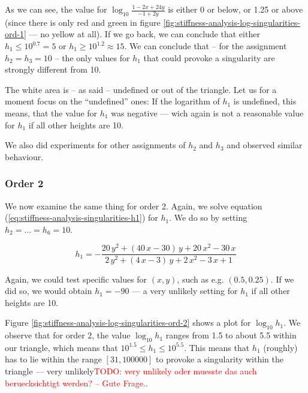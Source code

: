 \documentclass{article}
\newcommand{\todo}[2][]{\textcolor{red}{TODO\ifthenelse{\equal{#1}{}}{}{[#1]}: #2}}
\begin{document}
As we can see, the value for $\log_{10}\frac{1-2x+24y}{-1+2y}$ is either 0 or below, or 1.25 or above (since there is only red and green in figure \ref{fig:stiffness-analysis-log-singularities-ord-1} --- no yellow at all). If we go back, we can conclude that either $h_1 \leq 10^{0.7} = 5$ or $h_1\geq 10^{1.2} \approx 15$. We can conclude that -- for the assignment $h_2=h_3=10$ -- the only values for $h_1$ that could provoke a singularity are strongly different from 10.

The white area is -- as said -- undefined or out of the triangle. Let us for a moment focus on the ``undefined'' ones: If the logarithm of $h_1$ is undefined, this means, that the value for $h_1$ was negative --- wich again is not a reasonable value for $h_1$ if all other heights are 10.

We also did experiments for other assignments of $h_2$ and $h_3$ and observed similar behaviour.

\subsubsection{Order 2}
\label{sec:stiffness-analysis-singularities-ord-2}

We now examine the same thing for order 2. Again, we solve equation (\ref{eq:stiffness-analysis-singularities-h1}) for $h_1$. We do so by setting $h_2=\dots=h_6=10$.


\begin{equation*}
  h_1 = -\frac{20\,y^2+\left(40\,x-30\right)\,y+20\,x^2-30\,x}{2\,y^2+
    \left(4\,x-3\right)\,y+2\,x^2-3\,x+1}
\end{equation*}

Again, we could test specific values for $(x,y)$, such as e.g. $(0.5, 0.25)$. If we did so, we would obtain $h_1=-90$ --- a very unlikely setting for $h_1$ if all other heights are 10.

Figure \ref{fig:stiffness-analysis-log-singularities-ord-2} shows a plot for $\log_{10} h_1$. We observe that for order 2, the value $\log_{10} h_1$ ranges from 1.5 to about 5.5 within our triangle, which means that $10^{1.5} \leq h_1 \leq 10^{5.5}$. This means that $h_1$ (roughly) has to lie within the range $\left[ 31, 100000 \right]$ to provoke a singularity within the triangle --- very unlikely\todo{very unlikely oder muesste das auch beruecksichtigt werden? -- Gute Frage.}.
\end{document}
